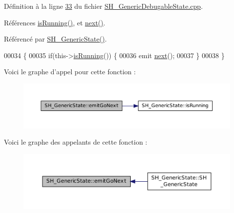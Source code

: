 Définition à la ligne \hyperlink{SH__GenericDebugableState_8cpp_source_l00033}{33} du fichier \hyperlink{SH__GenericDebugableState_8cpp_source}{S\-H\-\_\-\-Generic\-Debugable\-State.\-cpp}.



Références \hyperlink{classSH__GenericState_a5f731810dad0cacd28828ccbf1539e4e}{is\-Running()}, et \hyperlink{classSH__GenericState_ad5e2a1f3dc129336c8f529cf897c2eb0}{next()}.



Référencé par \hyperlink{classSH__GenericState_a3cc3cb1491b812dfdd032fc6438dfd4e}{S\-H\-\_\-\-Generic\-State()}.


\begin{DoxyCode}
00034 \{
00035     \textcolor{keywordflow}{if}(this->\hyperlink{classSH__GenericState_a5f731810dad0cacd28828ccbf1539e4e}{isRunning}()) \{
00036         emit \hyperlink{classSH__GenericState_ad5e2a1f3dc129336c8f529cf897c2eb0}{next}();
00037     \}
00038 \}
\end{DoxyCode}


Voici le graphe d'appel pour cette fonction \-:
\nopagebreak
\begin{figure}[H]
\begin{center}
\leavevmode
\includegraphics[width=350pt]{classSH__GenericState_a66d4d4d94ef4fac3eb8d137848290582_cgraph}
\end{center}
\end{figure}




Voici le graphe des appelants de cette fonction \-:
\nopagebreak
\begin{figure}[H]
\begin{center}
\leavevmode
\includegraphics[width=350pt]{classSH__GenericState_a66d4d4d94ef4fac3eb8d137848290582_icgraph}
\end{center}
\end{figure}


